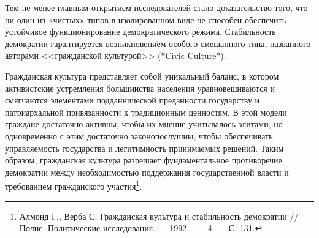 Тем не менее главным открытием исследователей стало доказательство того, что ни один из «чистых» типов в изолированном виде не способен обеспечить устойчивое функционирование демократического режима. Стабильность демократии гарантируется возникновением особого смешанного типа, названного авторами <<гражданской культурой>> (*Civic Culture*). 

Гражданская культура представляет собой уникальный баланс, в котором активистские устремления большинства населения уравновешиваются и смягчаются элементами подданнической преданности государству и патриархальной привязанности к традиционным ценностям. В этой модели граждане достаточно активны, чтобы их мнение учитывалось элитами, но одновременно с этим достаточно законопослушны, чтобы обеспечивать управляемость государства и легитимность принимаемых решений. Таким образом, гражданская культура разрешает фундаментальное противоречие демократии между необходимостью поддержания государственной власти и требованием гражданского участия\footnote{Алмонд Г., Верба С. Гражданская культура и стабильность демократии // Полис. Политические исследования. --- 1992. --- \textnumero~4. --- С. 131.}.